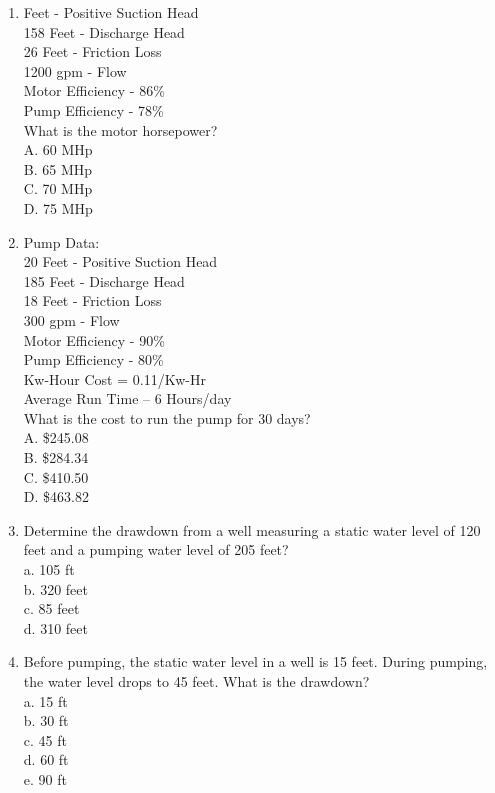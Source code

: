 \begin{enumerate}
\item Feet - Positive Suction Head\\
158 Feet - Discharge Head\\
26 Feet - Friction Loss\\
1200 gpm - Flow\\
Motor Efficiency - 86\%\\
Pump Efficiency - 78\%\\
What is the motor horsepower?\\
A. 60 MHp\\
B. 65 MHp\\
C. 70 MHp\\
D. 75 MHp\\

\item Pump Data:\\
20 Feet - Positive Suction Head\\
185 Feet - Discharge Head\\
18 Feet - Friction Loss\\
300 gpm - Flow\\
Motor Efficiency - 90\%\\
Pump Efficiency - 80\%\\
Kw-Hour Cost = 0.11/Kw-Hr\\
Average Run Time – 6 Hours/day\\
What is the cost to run the pump for 30 days?\\
A. \$245.08\\
B. \$284.34\\
C. \$410.50\\
D. \$463.82\\


\item Determine the drawdown from a well measuring a static water level of 120 feet and a pumping water level of 205 feet?\\
a. 105 ft\\
b. 320 feet\\
c. 85 feet\\
d. 310 feet\\

\item Before pumping, the static water level in a well is 15 feet. During pumping, the water level drops to 45 feet. What is the drawdown?\\
a. 15 ft\\
b. 30 ft\\
c. 45 ft\\
d. 60 ft\\
e. 90 ft\\


\end{enumerate}
